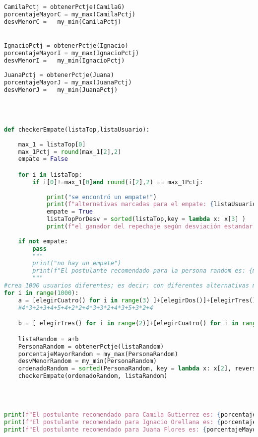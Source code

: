 \documentclass[a4paper]{article}
\begin{document}
\begin{lstlisting}[language=Python]
CamilaPctj = obtenerPctje(CamilaG)
porcentajeMayorC = my_max(CamilaPctj)
desvMenorC =   my_min(CamilaPctj)


IgnacioPctj = obtenerPctje(Ignacio)
porcentajeMayorI = my_max(IgnacioPctj)
desvMenorI =   my_min(IgnacioPctj)
    
JuanaPctj = obtenerPctje(Juana)
porcentajeMayorJ = my_max(JuanaPctj)
desvMenorJ =   my_min(JuanaPctj)
    



def checkerEmpate(listaTop,listaUsuario):
    
    max_1 = listaTop[0]
    max_1Pctj = round(max_1[2],2)
    empate = False

    for i in listaTop:
        if i[0]!=max_1[0]and round(i[2],2) == max_1Pctj: 
            
            print("se encontró un empate!")
            print(f"alternativas marcadas para el empate: {listaUsuario}")
            empate = True
            listaTopPorDesv = sorted(listaTop,key = lambda x: x[3] )
            print(f"el ganador del repechaje según desviación estandar es {listaTopPorDesv[0][0]}")
            
    if not empate:
        pass
        """
        print("no hay un empate")
        print(f"El postulante recomendado para la persona random es: {max_1[0]}; ya que tienen un porcentaje de afinidad total de: {max_1[2]*100}%")
        """
#crea 1000 usuarios diferentes; es decir; con diferentes alternativas marcadas. Con esto se buscan empates
for i in range(1000):
    a = [elegirCuatro() for i in range(3) ]+[elegirDos()]+[elegirTres()]+[elegirCuatro()]+[elegirCinco()]+[elegirCuatro()]+[elegirDos() for i in range(2)]+[elegirCuatro() for i in range(3)]
    #4*3+2+3+4+5+4+2*2+4*3+3*2+4*3+5+3*2+4

    b = [ elegirTres() for i in range(2)]+[elegirCuatro() for i in range(3)]+[elegirCinco()]+[ elegirTres() for i in range(2)]+[elegirCuatro()]

    listaRandom = a+b
    PersonaRandom = obtenerPctje(listaRandom) 
    porcentajeMayorRandom = my_max(PersonaRandom)
    desvMenorRandom = my_min(PersonaRandom)
    ordenadoRandom = sorted(PersonaRandom, key = lambda x: x[2], reverse=True)
    checkerEmpate(ordenadoRandom, listaRandom)
    
    


print(f"El postulante recomendado para Camila Gutierrez es: {porcentajeMayorC[0]}; ya que tienen un porcentaje de afinidad total de: {porcentajeMayorC[2]*100}%")
print(f"El postulante recomendado para Ignacio Orellana es: {porcentajeMayorI[0]}; ya que tienen un porcentaje de afinidad total de: {porcentajeMayorI[2]*100}%")
print(f"El postulante recomendado para Juana Flores es: {porcentajeMayorJ[0]}; ya que tienen un porcentaje de afinidad total de: {porcentajeMayorJ[2]*100}%")
 

\end{lstlisting}
\end{document}

